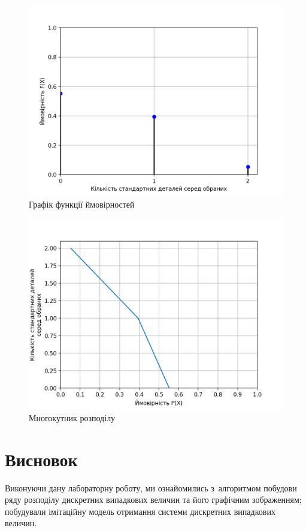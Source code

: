\documentclass[
	a4paper,
	oneside,
	BCOR = 10mm,
	DIV = 12,
	12pt,
	headings = normal,
]{scrartcl}
\begin{document}
		\begin{figure}[!htbp]
			\centering
			\includegraphics[height = 14\baselineskip]{./assets/y03s02-imitmod-lab-03-p01.png}
			\caption{Графік функції ймовірностей}
			\label{fig:pmf}
		\end{figure}%

		\begin{figure}[!htbp]
			\centering
			\includegraphics[height = 14\baselineskip]{./assets/y03s02-imitmod-lab-03-p02.png}
			\caption{Многокутник розподілу}
			\label{fig:dist-polygon}
		\end{figure}

		\section{Висновок}
			Виконуючи дану лабораторну роботу, ми ознайомились з~алгоритмом побудови ряду розподілу дискретних випадкових величин та його графічним зображенням; побудували імітаційну модель отримання системи дискретних випадкових величин.
		\appendix
\end{document}
